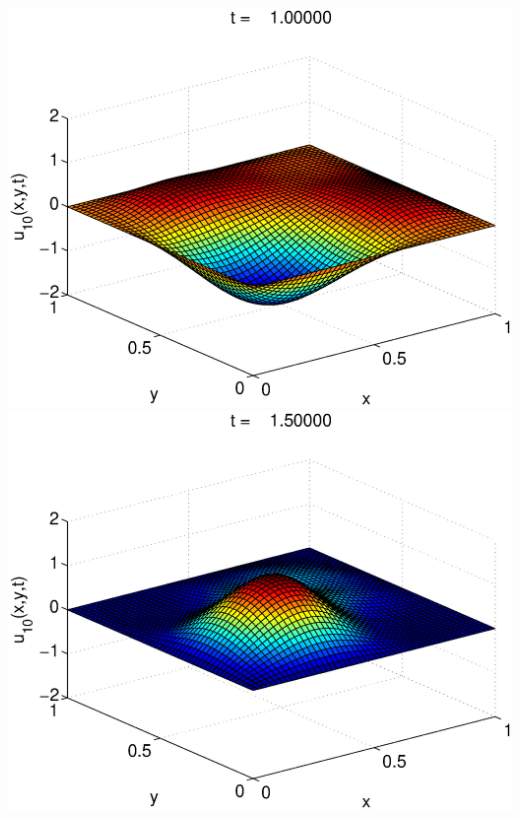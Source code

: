 \begin{solution}
\begin{enumerate}
\begin{center}
\includegraphics[scale=0.37]{wave2d_3} \quad
\includegraphics[scale=0.37]{wave2d_4}


\end{center}
\end{enumerate}
\end{solution}
